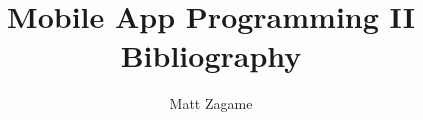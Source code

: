 \documentclass[11pt]{article}
\begin{document}
\title{Mobile App Programming II Bibliography}
\author{Matt Zagame}
\maketitle
\nocite{*}

\end{document}
